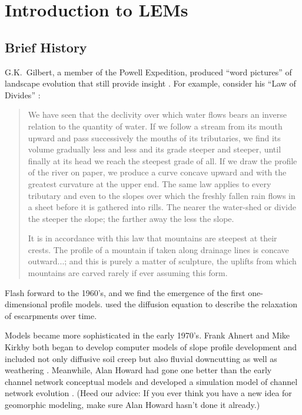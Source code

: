 \documentclass[12pt,reqno]{amsart}
\begin{document}
\section{Introduction to LEMs}

\subsection{Brief History}

G.K.\ Gilbert, a member of the Powell Expedition, produced
``word pictures'' of landscape evolution that still provide insight
\citep{gilbert1877report}. For example, consider his ``Law of Divides'' \citep{gilbert1877report}:

\begin{quote}
\small
We have seen that the declivity over which water flows bears an
inverse relation to the quantity of water. If we follow a stream from
its mouth upward and pass successively the mouths of its tributaries,
we find its volume gradually less and less and its grade steeper and
steeper, until finally at its head we reach the steepest grade of
all. If we draw the profile of the river on paper, we produce a curve
concave upward and with the greatest curvature at the upper end. The
same law applies to every tributary and even to the slopes over which
the freshly fallen rain flows in a sheet before it is gathered into
rills. The nearer the water-shed or divide the steeper the slope; the
farther away the less the slope.

It is in accordance with this law that mountains are steepest at their
crests. The profile of a mountain if taken along drainage lines is
concave outward...; and this is purely a
matter of sculpture, the uplifts from which mountains are carved
rarely if ever assuming this form. 
\end{quote}

Flash forward to the 1960's, and we find the emergence of the first one-dimensional
profile models. \citet{culling1963soil} used the diffusion equation to
describe the relaxation of escarpments over time. 

Models became more sophisticated in the early 1970's.
Frank Ahnert and Mike Kirkby both began to develop computer models of
slope profile development and included not only diffusive soil creep but also
fluvial downcutting as well as weathering
\citep{ahnert1971general,kirkby1971hillslope}. Meanwhile, Alan Howard
had gone one better than the early channel network conceptual models
and developed a simulation model of channel network evolution
\citep{howard1971simulation}. (Heed our advice: If you ever think you
have a new idea for geomorphic modeling, make sure Alan Howard hasn't
done it already.)
\end{document}
